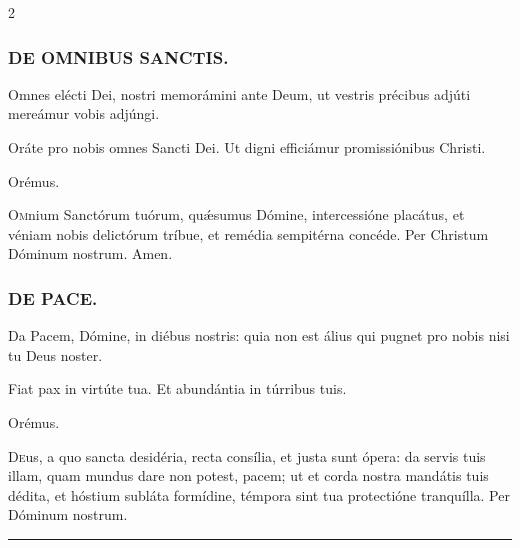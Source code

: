 \documentclass[9pt,twoside]{extarticle}
\begin{document}
\begin{multicols}{2}
\subsubsection*{\center \textsc{DE OMNIBUS SANCTIS.}}
\begin{tightlist}{}
\item {} Omnes elécti Dei, nostri memorámini ante Deum, ut vestris précibus adjúti mereámur vobis adjúngi.
\item {} Oráte pro nobis omnes Sancti Dei.  Ut digni efficiámur promissiónibus Christi.
\item Orémus. \hfill {}
\end{tightlist}
\lettrine{O}mnium Sanctórum tuórum, quǽsumus Dómine, intercessióne placátus, et véniam nobis delictórum tríbue, et remédia sempitérna concéde. Per Christum Dóminum nostrum. Amen.

\subsubsection*{\center \textsc{DE PACE.}}
\begin{tightlist}{}
\item {} Da Pacem, Dómine, in diébus nostris: quia non est álius qui pugnet pro nobis nisi tu Deus noster.
\item {} Fiat pax in virtúte tua.  Et abundántia in túrribus tuis.
\item Orémus. \hfill {}
\end{tightlist}
\lettrine{D}eus, a quo sancta desidéria, recta consília, et justa sunt ópera: da servis tuis illam, quam mundus dare non potest, pacem; ut et corda nostra mandátis tuis dédita, et hóstium subláta formídine, témpora sint tua protectióne tranquílla. Per Dóminum nostrum.

\begin{center}\textcolor{red}{\rule{\linewidth}{0.5pt}} \end{center}


\end{multicols}
\end{document}
